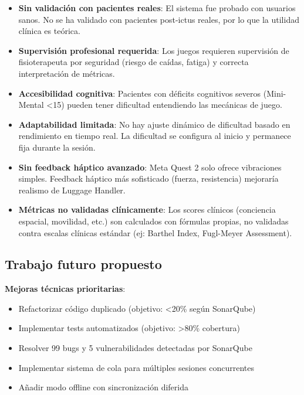 \begin{itemize}
    \item \textbf{Sin validación con pacientes reales}: El sistema fue probado con usuarios sanos. No se ha validado con pacientes post-ictus reales, por lo que la utilidad clínica es teórica.
    
    \item \textbf{Supervisión profesional requerida}: Los juegos requieren supervisión de fisioterapeuta por seguridad (riesgo de caídas, fatiga) y correcta interpretación de métricas.
    
    \item \textbf{Accesibilidad cognitiva}: Pacientes con déficits cognitivos severos (Mini-Mental <15) pueden tener dificultad entendiendo las mecánicas de juego.
    
    \item \textbf{Adaptabilidad limitada}: No hay ajuste dinámico de dificultad basado en rendimiento en tiempo real. La dificultad se configura al inicio y permanece fija durante la sesión.
    
    \item \textbf{Sin feedback háptico avanzado}: Meta Quest 2 solo ofrece vibraciones simples. Feedback háptico más sofisticado (fuerza, resistencia) mejoraría realismo de Luggage Handler.
    
    \item \textbf{Métricas no validadas clínicamente}: Los scores clínicos (conciencia espacial, movilidad, etc.) son calculados con fórmulas propias, no validadas contra escalas clínicas estándar (ej: Barthel Index, Fugl-Meyer Assessment).
\end{itemize}

\subsection{Trabajo futuro propuesto}

\textbf{Mejoras técnicas prioritarias}:
\begin{itemize}
    \item Refactorizar código duplicado (objetivo: <20\% según SonarQube)
    \item Implementar tests automatizados (objetivo: >80\% cobertura)
    \item Resolver 99 bugs y 5 vulnerabilidades detectadas por SonarQube
    \item Implementar sistema de cola para múltiples sesiones concurrentes
    \item Añadir modo offline con sincronización diferida
\end{itemize}


